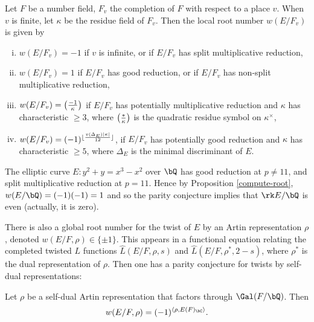 \begin{prop}\cite[Theorem 3.1]{DD-BSD}\label{compute-root}
    Let $F$ be a number field, $F_v$ the completion of $F$ with respect to a place $v$. When $v$ is finite, 
    let $\kappa$ be the residue field of $F_v$. Then the local root number $w(E / F_v)$ is given by 
    \begin{enumerate}[(i)]
        \setlength\itemsep{0em}
        \item $w(E / F_v) = -1$ if $v$ is infinite, or if  $E / F_v$ has split multiplicative reduction,
        \item $w(E / F_v) = 1$ if $E / F_v$ has good reduction, or if $E / F_v$ has non-split multiplicative reduction, 
        \item $w(E / F_v) = \left( \frac{-1}{\kappa} \right) $ if $E / F_v$ has potentially multiplicative reduction and $\kappa$ has characteristic $\geq 3$, where $\left( \frac{*}{\kappa} \right) $ is the quadratic residue symbol on ${\kappa}^{\times}$,
        \item $w(E / F_v) = (-1)^{\lfloor\frac{v(\Delta_E)|\kappa|}{12}\rfloor}$, if $E / F_v$ has potentially good reduction and $\kappa$ has characteristic $\geq 5$, where $\Delta_E$ is the minimal discriminant of $E$.  
    \end{enumerate} 
\end{prop}

\begin{example}
    The elliptic curve $E \colon y^2 + y = x^3  - x^2$ over $\bQ$ has good reduction at $p \not= 11$, and split multiplicative reduction at $p = 11$. Hence by Proposition \ref{compute-root}, $w(E / \bQ) = (-1)(-1) = 1$ and so the parity conjecture implies that $\rk E / \bQ$ is even (actually, it is zero). 
\end{example}

There is also a global root number for the twist of $E$ by an Artin representation $\rho$, denoted $w(E / F, \rho) \in \{ \pm 1 \}$. This appears in a functional equation relating the completed twisted $L$ functions $\hat{L}(E / F, \rho, s)$ and $\hat{L}(E / F, \rho^*, 2 - s)$, where $\rho^*$ is the dual representation of $\rho$. Then one has a parity conjecture for twists by self-dual representations:

\begin{conj}
   Let $\rho$ be a self-dual Artin representation that factors through $\Gal(F / \bQ)$. Then $$ w(E / F, \rho) = (-1)^{\langle \rho, E(F)_{\bC} \rangle}.$$
\end{conj}

